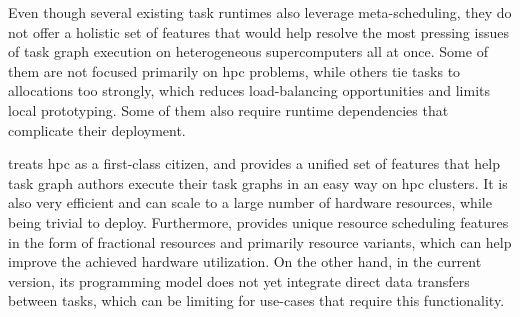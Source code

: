 Even though several existing task runtimes also leverage meta-scheduling, they do not offer a
holistic set of features that would help resolve the most pressing issues of task graph execution
on heterogeneous supercomputers all at once. Some of them are not focused primarily on
\gls{hpc} problems, while others tie tasks to allocations too strongly, which
reduces load-balancing opportunities and limits local prototyping. Some of them also require
runtime dependencies that complicate their deployment.

\hyperqueue{} treats \gls{hpc} as a first-class citizen, and provides a
unified set of features that help task graph authors execute their task graphs in an easy way on
\gls{hpc} clusters. It is also very efficient and can scale to a large number of
hardware resources, while being trivial to deploy. Furthermore, \hyperqueue{} provides
unique resource scheduling features in the form of fractional resources and primarily resource
variants, which can help improve the achieved hardware utilization. On the other hand, in the
current version, its programming model does not yet integrate direct data transfers between tasks,
which can be limiting for use-cases that require this functionality.

